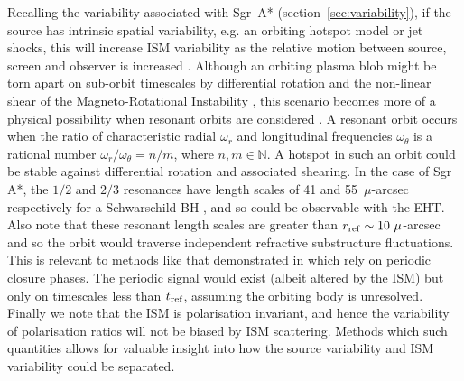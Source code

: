Recalling the variability associated with Sgr~A* (section~\ref{sec:variability}), if the source has intrinsic spatial variability, e.g. an orbiting hotspot model \citep{Doeleman_2009} or jet shocks, this will increase ISM variability as the relative motion between source, screen and observer is increased \citep{Blecher_2016}. Although an orbiting plasma blob might be torn apart on sub-orbit timescales by differential rotation and the non-linear shear of the Magneto-Rotational Instability \citep[(MRI)][]{Balbus_1991}, this scenario becomes more of a physical possibility when resonant orbits are considered \citep{Brink_2015}. A resonant orbit occurs when the ratio of characteristic radial $\omega_r$ and longitudinal frequencies $\omega_\theta$ is a rational number $\omega_r/\omega_\theta = n/m$, where $n,m \in \mathbb{N}$. A hotspot in such an orbit could be stable against differential rotation and associated shearing. In the case of Sgr A*, the $1/2$ and $2/3$ resonances have  length scales of 41 and 55~$\mu$-arcsec respectively for a Schwarschild BH \citep{Brink_2015}, and so could be observable with the EHT. Also note that these resonant length scales are greater than $r_{\rm ref} \sim 10\ \mu$-arcsec and so the orbit would traverse independent refractive substructure fluctuations. This is relevant to methods like that demonstrated in \citet{Doeleman_2009} which rely on periodic closure phases. The periodic signal would exist (albeit altered by the ISM) but only on timescales less than $t_{\rm ref}$, assuming the orbiting body is unresolved. 
Finally we note that the ISM is polarisation invariant, and hence the variability of polarisation ratios will not be biased by ISM scattering. Methods which such quantities \citep[e.g.][]{Johnson_2014} allows for valuable insight into how the source variability and ISM variability could be separated.



